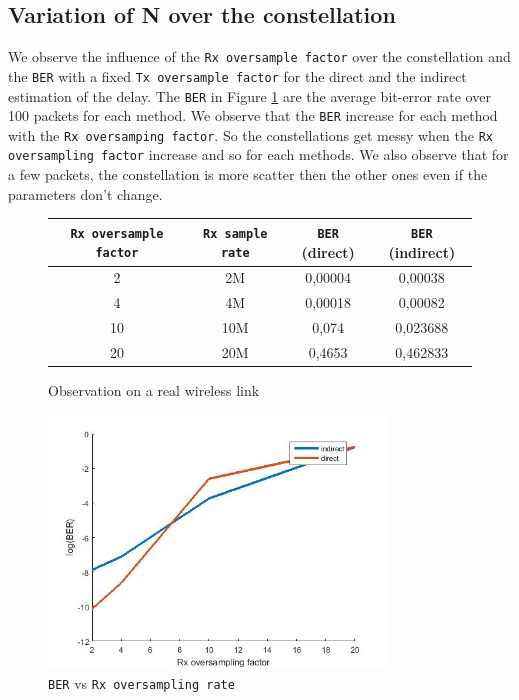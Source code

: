 \documentclass{article}
\begin{document}
    \subsection{Variation of N over the constellation}
        We observe the influence of the \texttt{Rx oversample factor} over the constellation and the \texttt{BER} with a fixed \texttt{Tx oversample factor} for the direct and the indirect estimation of the delay. The \texttt{BER} in Figure \ref{obs} are the average bit-error rate over 100 packets for each method. 
        We observe that the \texttt{BER} increase for each method with the \texttt{Rx oversamping factor}. So the constellations get messy when the \texttt{Rx oversampling factor} increase and so for each methods. 
        We also observe that for a few packets, the constellation is more scatter then the other ones even if the parameters don't change. 
        \begin{figure}[h]
        \centering
        \begin{tabular}{|c|c|c|c|}
            \hline
            \texttt{Rx oversample factor} & \texttt{Rx sample rate} & \texttt{BER} (direct) & \texttt{BER} (indirect) \\
            \hline
            2 & 2M & 0,00004 & 0,00038\\
            \hline
            4 & 4M & 0,00018& 0,00082\\
            \hline
            10 & 10M & 0,074 & 0,023688\\
            \hline
            20 & 20M & 0,4653 & 0,462833\\
            \hline
        \end{tabular}
        \caption{Observation on a real wireless link \label{obs}}
        \end{figure}
        \begin{figure}[h]
            \centering
            \includegraphics[width = 0.8\textwidth]{logber.jpg}
            \caption{\texttt{BER} vs \texttt{Rx oversampling rate}} 
        \end{figure}
        
\end{document}

